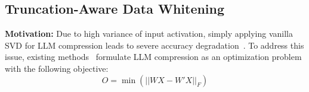 \subsection{Truncation-Aware Data Whitening}
\label{subsec:activation_aware_weight_whitening}
\textbf{Motivation:}
Due to high variance of input activation, simply applying vanilla SVD for LLM compression leads to severe accuracy degradation~\citep{DBLP:journals/corr/abs-2312-05821}. To address this issue, existing methods~\citep{DBLP:journals/corr/abs-2312-05821, DBLP:conf/iclr/HsuHCLSJ22} formulate LLM compression as an optimization problem with the following objective:
\vspace{-0mm}
\begin{equation}
    O = \min(||WX-W'X||_F) 
    \label{eq:t1}
\end{equation}
       
